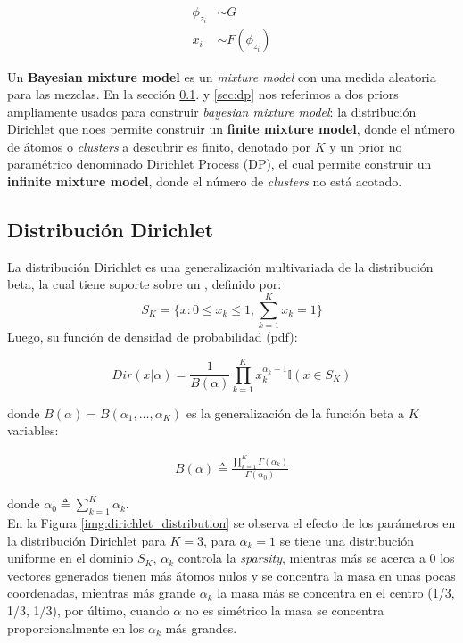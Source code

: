 \documentclass[letterpaper,12pt,oneside]{book} %
\begin{document}
\begin{align}
\phi_{z_{i}} & \sim G\\
x_{i} & \sim  F(\phi_{z_{i}})
\end{align}

Un \textbf{Bayesian mixture model} es un \textit{mixture model} con una medida aleatoria para las mezclas. En la sección \ref{sec:dirichlet}. y \ref{sec:dp} nos referimos a dos priors ampliamente usados para construir \textit{bayesian mixture model}: la distribución Dirichlet que noes permite construir un \textbf{finite mixture model}, donde el número de átomos o \textit{clusters} a descubrir es finito, denotado por $K$ y un prior no paramétrico denominado Dirichlet Process (DP), el cual permite construir un \textbf{infinite mixture model}, donde el número de \textit{clusters} no está acotado. 

\subsection{Distribución Dirichlet}
\label{sec:dirichlet}

La distribución Dirichlet es una generalización multivariada de la distribución beta, la cual tiene soporte sobre un , definido por:
\begin{equation}
    S_{K} = \{x: 0\leq x_{k} \leq 1, \sum_{k=1}^{K}x_{k}=1\}
\end{equation}
Luego, su función de densidad de probabilidad (pdf):

\begin{equation}
    Dir(x|\alpha)=\frac{1}{B(\alpha)}\prod_{k=1}^{K}x_{k}^{\alpha_{k}-1}\mathbb{I}(x\in S_{K})
\end{equation}

donde $B(\alpha) = B(\alpha_{1}, \ldots, \alpha_{K})$ es la generalización de la función beta a $K$ variables:

\begin{align}
    B(\alpha) \triangleq \frac{\prod_{k=1}^{K}\Gamma(\alpha_{k})}{\Gamma(\alpha_{0})}
\end{align}

donde $\alpha_{0} \triangleq \sum_{k=1}^{K}\alpha_{k}$.\\

En la Figura \ref{img:dirichlet_distribution} se observa el efecto de los parámetros en la distribución Dirichlet para $K=3$, para $\alpha_{k}=1$ se tiene una distribución uniforme en el dominio $S_{K}$, $\alpha_{k}$ controla la \textit{sparsity}, mientras más se acerca a 0 los vectores generados tienen más átomos nulos y se concentra la masa en unas pocas coordenadas, mientras más grande $\alpha_{k}$ la masa más se concentra en el centro (1/3, 1/3, 1/3), por último, cuando $\alpha$ no es simétrico la masa se concentra proporcionalmente en los $\alpha_{k}$ más grandes.\\
\end{document}
